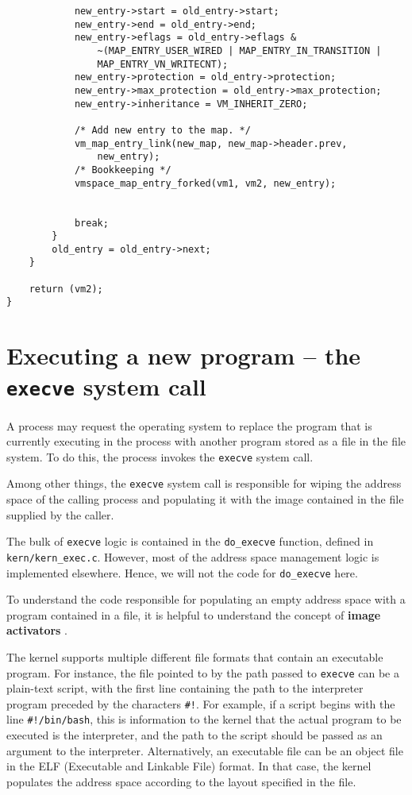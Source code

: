 \documentclass[shortabstract, english]{iithesis}
\newenvironment{code}{}{}
\begin{document}
\begin{code}
\begin{verbatim}
            new_entry->start = old_entry->start;
            new_entry->end = old_entry->end;
            new_entry->eflags = old_entry->eflags &
                ~(MAP_ENTRY_USER_WIRED | MAP_ENTRY_IN_TRANSITION |
                MAP_ENTRY_VN_WRITECNT);
            new_entry->protection = old_entry->protection;
            new_entry->max_protection = old_entry->max_protection;
            new_entry->inheritance = VM_INHERIT_ZERO;

            /* Add new entry to the map. */
            vm_map_entry_link(new_map, new_map->header.prev,
                new_entry);
            /* Bookkeeping */
            vmspace_map_entry_forked(vm1, vm2, new_entry);


            break;
        }
        old_entry = old_entry->next;
    }

    return (vm2);
}
\end{verbatim}
\end{code}

\section{Executing a new program -- the \texttt{execve} system call}

A process may request the operating system to replace the program that is
currently executing in the process with another program stored as a file in the
file system. To do this, the process invokes the \texttt{execve} system call.

Among other things, the \texttt{execve} system call is responsible for wiping
the address space of the calling process and populating it with the image
contained in the file supplied by the caller.

The bulk of \texttt{execve} logic is contained in the \texttt{do_execve}
function, defined in \texttt{kern/kern\_exec.c}. However, most of the address
space management logic is implemented elsewhere. Hence, we will not the code for
\texttt{do_execve} here.

To understand the code responsible for populating an empty address space with a
program contained in a file, it is helpful to understand the concept of
\textbf{image activators} \cite[Section~3.5]{bib:mckusick04}.

The kernel supports multiple different file formats that contain an executable
program. For instance, the file pointed to by the path passed to \texttt{execve}
can be a plain-text script, with the first line containing the path to the
interpreter program preceded by the characters \texttt{\#!}. For example, if a
script begins with the line \texttt{\#!/bin/bash}, this is information to the
kernel that the actual program to be executed is the interpreter, and the path
to the script should be passed as an argument to the interpreter. Alternatively,
an executable file can be an object file in the ELF (Executable and Linkable
File) format. In that case, the kernel populates the address space according to
the layout specified in the file.
\end{document}
